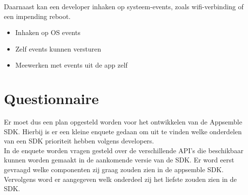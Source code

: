 Daarnaast kan een developer inhaken op systeem-events, zoals wifi-verbinding of een impending reboot. 
\begin{itemize}
	\item Inhaken op OS events
	\item Zelf events kunnen versturen
	\item Meewerken met events uit de app zelf
\end{itemize}

\section{Questionnaire}

Er moet dus een plan opgesteld worden voor het ontwikkelen van de Appsemble SDK. Hierbij is er een kleine enquete gedaan om uit te vinden welke onderdelen van een SDK prioriteit hebben volgens developers. \\

In de enquete worden vragen gesteld over de verschillende API's die beschikbaar kunnen worden gemaakt in de aankomende versie van de SDK. Er word eerst gevraagd welke componenten zij graag zouden zien in de appsemble SDK. Vervolgens word er aangegeven welk onderdeel zij het liefste zouden zien in de SDK. \\